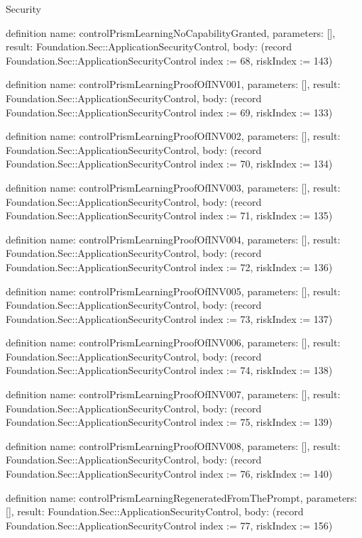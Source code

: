 \begin{lexlean}{Security}
\begin{semanticmodule}
definition{
  name: controlPrismLearningNoCapabilityGranted,
  parameters: [],
  result: Foundation.Sec::ApplicationSecurityControl,
  body: (record Foundation.Sec::ApplicationSecurityControl {index := 68, riskIndex := 143})
}

definition{
  name: controlPrismLearningProofOfINV001,
  parameters: [],
  result: Foundation.Sec::ApplicationSecurityControl,
  body: (record Foundation.Sec::ApplicationSecurityControl {index := 69, riskIndex := 133})
}

definition{
  name: controlPrismLearningProofOfINV002,
  parameters: [],
  result: Foundation.Sec::ApplicationSecurityControl,
  body: (record Foundation.Sec::ApplicationSecurityControl {index := 70, riskIndex := 134})
}

definition{
  name: controlPrismLearningProofOfINV003,
  parameters: [],
  result: Foundation.Sec::ApplicationSecurityControl,
  body: (record Foundation.Sec::ApplicationSecurityControl {index := 71, riskIndex := 135})
}

definition{
  name: controlPrismLearningProofOfINV004,
  parameters: [],
  result: Foundation.Sec::ApplicationSecurityControl,
  body: (record Foundation.Sec::ApplicationSecurityControl {index := 72, riskIndex := 136})
}

definition{
  name: controlPrismLearningProofOfINV005,
  parameters: [],
  result: Foundation.Sec::ApplicationSecurityControl,
  body: (record Foundation.Sec::ApplicationSecurityControl {index := 73, riskIndex := 137})
}

definition{
  name: controlPrismLearningProofOfINV006,
  parameters: [],
  result: Foundation.Sec::ApplicationSecurityControl,
  body: (record Foundation.Sec::ApplicationSecurityControl {index := 74, riskIndex := 138})
}

definition{
  name: controlPrismLearningProofOfINV007,
  parameters: [],
  result: Foundation.Sec::ApplicationSecurityControl,
  body: (record Foundation.Sec::ApplicationSecurityControl {index := 75, riskIndex := 139})
}

definition{
  name: controlPrismLearningProofOfINV008,
  parameters: [],
  result: Foundation.Sec::ApplicationSecurityControl,
  body: (record Foundation.Sec::ApplicationSecurityControl {index := 76, riskIndex := 140})
}

definition{
  name: controlPrismLearningRegeneratedFromThePrompt,
  parameters: [],
  result: Foundation.Sec::ApplicationSecurityControl,
  body: (record Foundation.Sec::ApplicationSecurityControl {index := 77, riskIndex := 156})
}


\end{semanticmodule}
\end{lexlean}
